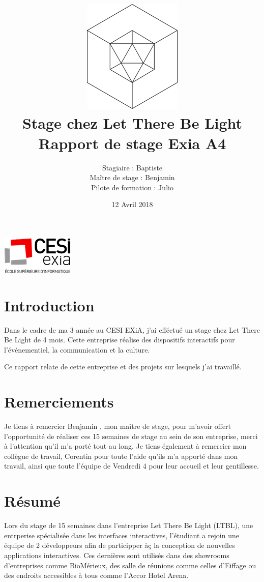\documentclass{article}
\title{\includegraphics{img/logo.png}\vspace{2cm}\\
    Stage chez Let There Be Light \\
    \large Rapport de stage Exia A4}
\date{12 Avril 2018}
\author{Stagiaire : Baptiste \bsc{Saclier} \\
    Maître de stage : Benjamin \bsc{Petit}\\
    Pilote de formation : Julio \bsc{Santilario}}
\begin{document}
    \maketitle
    \vspace{\fill}
    \hspace{\fill}\includegraphics{img/exia.png}

    \clearpage

    \tableofcontents

    \section{Introduction}

    Dans le cadre de ma 3 année au CESI EXiA, j'ai efféctué un stage chez Let There Be Light de 4 mois.
    Cette entreprise réalise des dispositifs interactifs pour l'événementiel, la communication et la culture.

    Ce rapport relate de cette entreprise et des projets sur lesquels j'ai travaillé.

    \clearpage

    \section{Remerciements}

    \vspace{\fill}

    Je tiens à remercier Benjamin , mon maître de stage, pour m'avoir offert l'opportunité de réaliser ces 15 semaines de stage au sein de son entreprise, merci à l'attention qu'il m'a porté tout au long.
    Je tiens également à remercier mon collègue de travail, Corentin  pour toute l'aide qu'ils m'a apporté dans mon travail, ainsi que toute l'équipe de Vendredi 4 pour leur accueil et leur gentillesse.

    \vspace{\fill}

    \clearpage

    \section{Résumé}

    Lors du stage de 15 semaines dans l'entreprise Let There Be Light (LTBL), une entrperise spécialisée dans les interfaces interactives, l'étudiant a rejoin une équipe de 2 développeurs afin de participper àç la conception de nouvelles applications interactives.
    Ces dernières sont utilisés dans des showrooms d'entreprises comme BioMérieux, des salle de réunions comme celles d'Eiffage ou des endroits accessibles à tous comme l'Accor Hotel Arena.
\end{document}
